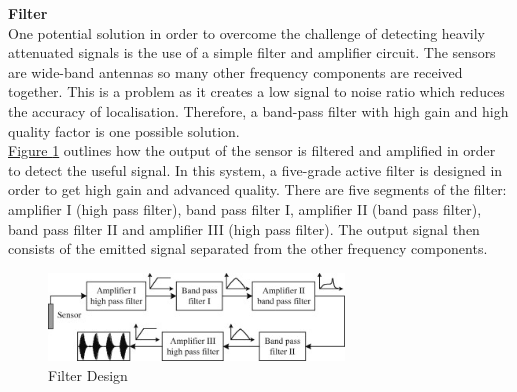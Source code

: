 \documentclass[11pt]{article}		%
\newcommand{\figref}[1]{\hyperref[#1]{Figure \ref*{#1}}}    %
\begin{document}
			\textbf{Filter}
			\\
	        One potential solution in order to overcome the challenge of detecting heavily attenuated signals is the use of a simple filter and amplifier circuit.
	        The sensors are wide-band antennas so many other frequency components are received together. This is a problem as it creates a low signal to noise ratio which reduces the accuracy of localisation.
	        Therefore, a band-pass filter with high gain and high quality factor is one possible solution.
	        \\
	        \hspace*{3ex}\figref{filterDesign} outlines how the output of the sensor is filtered and amplified in order to detect the useful signal. 
	        In this system, a five-grade active filter is designed in order to get high gain and advanced quality. There are five segments of the filter: amplifier I (high pass filter), band pass filter I, amplifier II (band pass filter), band pass filter II and amplifier III (high pass filter).
	        The output signal then consists of the emitted signal separated from the other frequency components. 
	        
	        \begin{figure}[h]
				\centering
				\includegraphics[width = 0.7\textwidth]{Filtering.jpg}
				\caption{Filter Design} %
				\label{filterDesign}
			\end{figure}
			
\end{document}
